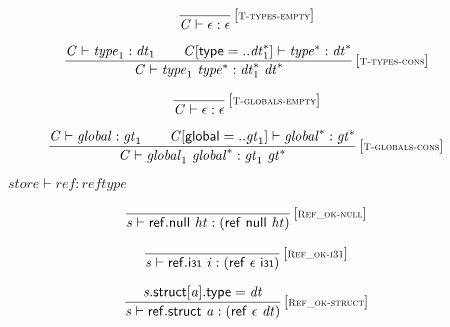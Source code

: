 \vspace{1ex}

$$
\begin{array}{@{}c@{}}\displaystyle
\frac{
}{
{\mathit{C}} \vdash \epsilon : \epsilon
} \, {[\textsc{\scriptsize T{-}types{-}empty}]}
\qquad
\end{array}
$$

$$
\begin{array}{@{}c@{}}\displaystyle
\frac{
{\mathit{C}} \vdash {\mathit{type}}_{{1}} : {\mathit{dt}}_{{1}}
 \qquad
{\mathit{C}}[\mathsf{type} = ..{{\mathit{dt}}_{{1}}^\ast}] \vdash {{\mathit{type}}^\ast} : {{\mathit{dt}}^\ast}
}{
{\mathit{C}} \vdash {\mathit{type}}_{{1}}~{{\mathit{type}}^\ast} : {{\mathit{dt}}_{{1}}^\ast}~{{\mathit{dt}}^\ast}
} \, {[\textsc{\scriptsize T{-}types{-}cons}]}
\qquad
\end{array}
$$

$$
\begin{array}{@{}c@{}}\displaystyle
\frac{
}{
{\mathit{C}} \vdash \epsilon : \epsilon
} \, {[\textsc{\scriptsize T{-}globals{-}empty}]}
\qquad
\end{array}
$$

$$
\begin{array}{@{}c@{}}\displaystyle
\frac{
{\mathit{C}} \vdash {\mathit{global}} : {\mathit{gt}}_{{1}}
 \qquad
{\mathit{C}}[\mathsf{global} = ..{\mathit{gt}}_{{1}}] \vdash {{\mathit{global}}^\ast} : {{\mathit{gt}}^\ast}
}{
{\mathit{C}} \vdash {\mathit{global}}_{{1}}~{{\mathit{global}}^\ast} : {\mathit{gt}}_{{1}}~{{\mathit{gt}}^\ast}
} \, {[\textsc{\scriptsize T{-}globals{-}cons}]}
\qquad
\end{array}
$$

$\boxed{{\mathit{store}} \vdash {\mathit{ref}} : {\mathit{reftype}}}$

$$
\begin{array}{@{}c@{}}\displaystyle
\frac{
}{
{\mathit{s}} \vdash \mathsf{ref.null}~{\mathit{ht}} : (\mathsf{ref}~\mathsf{null}~{\mathit{ht}})
} \, {[\textsc{\scriptsize Ref\_ok{-}null}]}
\qquad
\end{array}
$$

$$
\begin{array}{@{}c@{}}\displaystyle
\frac{
}{
{\mathit{s}} \vdash \mathsf{ref.i{\scriptstyle31}}~{\mathit{i}} : (\mathsf{ref}~\epsilon~\mathsf{i{\scriptstyle31}})
} \, {[\textsc{\scriptsize Ref\_ok{-}i31}]}
\qquad
\end{array}
$$

$$
\begin{array}{@{}c@{}}\displaystyle
\frac{
{\mathit{s}}.\mathsf{struct}[{\mathit{a}}].\mathsf{type} = {\mathit{dt}}
}{
{\mathit{s}} \vdash \mathsf{ref.struct}~{\mathit{a}} : (\mathsf{ref}~\epsilon~{\mathit{dt}})
} \, {[\textsc{\scriptsize Ref\_ok{-}struct}]}
\qquad
\end{array}
$$

